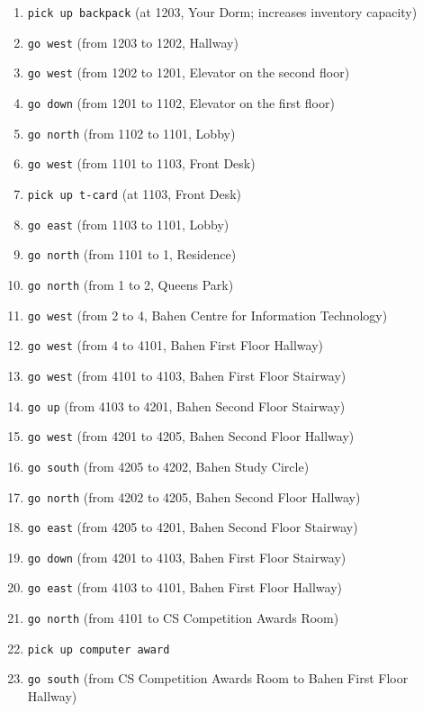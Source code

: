 \documentclass[11pt]{article}
\begin{document}
\begin{enumerate}
    \item \texttt{pick up backpack} \quad (at 1203, Your Dorm; increases inventory capacity)
    \item \texttt{go west} \quad (from 1203 to 1202, Hallway)
    \item \texttt{go west} \quad (from 1202 to 1201, Elevator on the second floor)
    \item \texttt{go down} \quad (from 1201 to 1102, Elevator on the first floor)
    \item \texttt{go north} \quad (from 1102 to 1101, Lobby)
    \item \texttt{go west} \quad (from 1101 to 1103, Front Desk)
    \item \texttt{pick up t-card} \quad (at 1103, Front Desk)
    \item \texttt{go east} \quad (from 1103 to 1101, Lobby)
    \item \texttt{go north} \quad (from 1101 to 1, Residence)
    \item \texttt{go north} \quad (from 1 to 2, Queens Park)
    \item \texttt{go west} \quad (from 2 to 4, Bahen Centre for Information Technology)
    \item \texttt{go west} \quad (from 4 to 4101, Bahen First Floor Hallway)
    \item \texttt{go west} \quad (from 4101 to 4103, Bahen First Floor Stairway)
    \item \texttt{go up} \quad (from 4103 to 4201, Bahen Second Floor Stairway)
    \item \texttt{go west} \quad (from 4201 to 4205, Bahen Second Floor Hallway)
    \item \texttt{go south} \quad (from 4205 to 4202, Bahen Study Circle)
    \item \texttt{go north} \quad (from 4202 to 4205, Bahen Second Floor Hallway)
    \item \texttt{go east} \quad (from 4205 to 4201, Bahen Second Floor Stairway)
    \item \texttt{go down} \quad (from 4201 to 4103, Bahen First Floor Stairway)
    \item \texttt{go east} \quad (from 4103 to 4101, Bahen First Floor Hallway)
    \item \texttt{go north} \quad (from 4101 to CS Competition Awards Room)
    \item \texttt{pick up computer award} 
    \item \texttt{go south} \quad (from CS Competition Awards Room to Bahen First Floor Hallway)

\end{enumerate}
\end{document}

